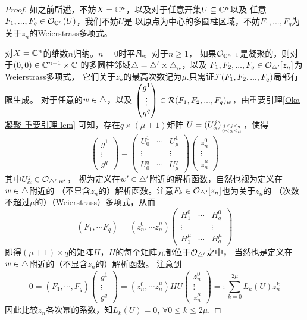 \begin{proof}
如之前所述，不妨$X=\mathbb{C}^n$，以及对于任意开集$U\subseteq\mathbb{C}^n$以及
任意$F_1,...,F_q\in\mathcal{O}_{\mathbb{C}^n}(U)$，我们不妨$U$是
以原点为中心的多圆柱区域，不妨$F_1,...,F_q$为关于$z_n$的Weierstrass多项式。

对$X=\mathbb{C}^n$的维数$n$归纳。$n=0$时平凡。对于$n\geq 1$，
如果$\mathcal{O}_{\mathbb{C}^{n-1}}$是凝聚的，则对于$(0,0)\in\mathbb{C}^{n-1}\times\mathbb{C}$
的多圆柱邻域$\triangle=\triangle'\times\triangle_n$，以及
$F_1,F_2,...,F_q\in\mathcal{O}_{\triangle'}[z_n]$为Weierstrass多项式，
它们关于$z_n$的最高次数记为$\mu$.只需证$\mathcal{F}(F_1,F_2,...,F_q)$局部有限生成。
对于任意的$w\in\triangle$，以及
$
  \begin{pmatrix}
    g^1 \\
    \vdots \\
    g^q
  \end{pmatrix}
\in\mathcal{R}(F_1,F_2,...,F_q)_w
$，由重要引理\ref{Oka凝聚-重要引理-lem}
可知，存在$q\times(\mu+1)$矩阵
$U=(U^j_\alpha)_{1\leq j\leq q\atop 0\leq\alpha\leq\mu}$，使得
$$
  \begin{pmatrix}
    g^1 \\
    \vdots \\
    g^q
  \end{pmatrix}
=
  \begin{pmatrix}
    U^1_0   & \cdots & U^1_\mu \\
    \vdots  &        & \vdots  \\
    U^q_0   & \cdots & U^q_\mu
  \end{pmatrix}
  \begin{pmatrix}
    z_n^0   \\
    \vdots  \\
    z_n^\mu
  \end{pmatrix}
$$
其中$U^j_\alpha\in\mathcal{O}_{\triangle',w'}$，
视为定义在$w'\in\triangle'$附近的解析函数，自然也视为定义在$w\in\triangle$附近的
（不显含$z_n$的）解析函数。注意$F_k\in\mathcal{O}_{\triangle'}[z_n]$也为关于$z_n$的
（次数不超过$\mu$的）（Weierstrass）多项式，从而
$$
  (F_1,\cdots F_q)
=
  (z_n^0,\cdots z_n^\mu)
  \begin{pmatrix}
    H^0_1   & \cdots & H^0_q  \\
    \vdots  &        & \vdots \\
    H^\mu_1 & \cdots & H^\mu_q
  \end{pmatrix}
$$
即得$(\mu+1)\times q$的矩阵$H$，$H$的每个矩阵元都位于$\mathcal{O}_{\triangle'}$之中，
当然也是定义在$w\in\triangle$附近的（不显含$z_n$的）解析函数。
注意到
$$
  0
=
  (F_1,\cdots,F_q)
  \begin{pmatrix}
    g^1   \\
    \vdots \\
    g^q
  \end{pmatrix}
=
  (z_n^0,\cdots z_n^\mu)
  HU
  \begin{pmatrix}
    z_n^0   \\
    \vdots  \\
    z_n^\mu
  \end{pmatrix}
=:
  \sum_{k=0}^{2\mu}L_k(U)z_n^k
$$
因此比较$z_n$各次幂的系数，知$L_k(U)=0,\,\forall0\leq k\leq 2\mu$.\vs


\end{proof}
